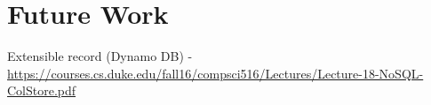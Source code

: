 \section{Future Work}
\label{sec:future}

Extensible record (Dynamo DB) - \url{https://courses.cs.duke.edu/fall16/compsci516/Lectures/Lecture-18-NoSQL-ColStore.pdf}


\newpage
